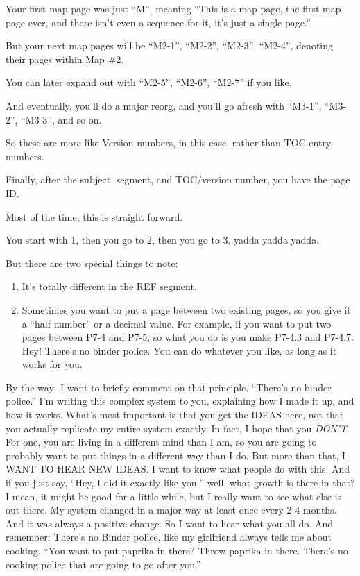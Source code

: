 \documentclass[oneside]{book}
\begin{document}
Your first map page was just ``M'', meaning ``This is a map page, the
first map page ever, and there isn't even a sequence for it, it's just
a single page.''

But your next map pages will be ``M2-1'', ``M2-2'', ``M2-3'', ``M2-4'',
denoting their pages within Map \#2.

You can later expand out with ``M2-5'', ``M2-6'', ``M2-7'' if you like.

And eventually, you'll do a major reorg, and you'll go afresh with
``M3-1'', ``M3-2'', ``M3-3'', and so on.

So these are more like Version numbers, in this case, rather than TOC
entry numbers.

Finally, after the subject, segment, and TOC/version number, you have the
page ID.

Most of the time, this is straight forward.

You start with 1, then you go to 2, then you go to 3, yadda yadda
yadda.

But there are two special things to note:

\begin{enumerate}
\item It's totally different in the REF segment.
\item Sometimes you want to put a page between two existing pages, so you
give it a ``half number'' or a decimal value. For example, if you want
to put two pages between P7-4 and P7-5, so what you do is you make
P7-4.3 and P7-4.7. Hey! There's no binder police. You can do whatever
you like, as long as it works for you.
\end{enumerate}

By the way- I want to briefly comment on that principle. ``There's no
binder police.'' I'm writing this complex system to you, explaining how
I made it up, and how it works. What's most important is that you get
the IDEAS here, not that you actually replicate my entire system
exactly. In fact, I hope that you \emph{DON'T}. For one, you are living in
a different mind than I am, so you are going to probably want to put
things in a different way than I do. But more than that, I WANT TO
HEAR NEW IDEAS. I want to know what people do with this. And if you
just say, ``Hey, I did it exactly like you,'' well, what growth is there
in that? I mean, it might be good for a little while, but I really
want to see what else is out there. My system changed in a major way
at least once every 2-4 months. And it was always a positive
change. So I want to hear what you all do. And remember: There's no
Binder police, like my girlfriend always tells me about cooking. ``You
want to put paprika in there? Throw paprika in there. There's no
cooking police that are going to go after you.''
\end{document}
